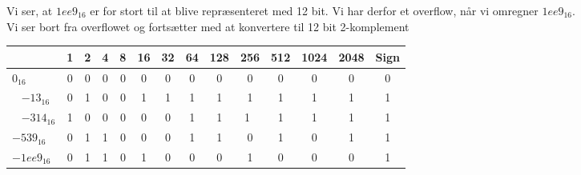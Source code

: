 \documentclass[a4,11pt]{article}
\begin{document}
Vi ser, at  $1ee9_{16}$ er for stort til at blive repræsenteret med 12 bit. Vi har derfor et overflow, når vi omregner  $1ee9_{16}$.\\

Vi ser bort fra overflowet og fortsætter med at konvertere til 12 bit 2-komplement
\begin{center}
  \begin{tabular}{ | l | c | c | c |  c |  c |  c |  c |  c |  c |  c |  c |  c |  c | }
    \hline
    & 1 & 2 & 4 & 8 & 16 & 32 & 64 & 128 & 256 & 512 & 1024 & 2048 & Sign\\ \hline
    $0_{16}$ &        0 & 0 & 0 & 0 & 0 & 0 & 0 & 0 & 0 & 0 & 0 & 0 & 0 \\ \hline
    $-13_{16}$ &      0 & 1 & 0 & 0 & 1 & 1 & 1 & 1 & 1 & 1 & 1 & 1 & 1 \\ \hline
    $-314_{16}$ &    1 & 0 & 0 & 0 & 0 & 0 & 1 & 1 & 1 & 1 & 1 & 1 & 1 \\ \hline
    $-539_{16}$ &    0 & 1 & 1 & 0 & 0 & 0 & 1 & 1 & 0 & 1 & 0 & 1 & 1 \\ \hline
    $-1ee9_{16}$ &   0 & 1 & 1 & 0 & 1 & 0 & 0 & 0 & 1 & 0 & 0 & 0 & 1 \\
    \hline
  \end{tabular}
\end{center}
\end{document}
